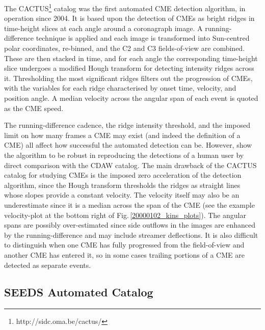 \documentclass[referee,a4paper,12pt,traditabstract]{swsc}
\begin{document}
\begin{linenumbers}
The CACTUS\footnote{http://sidc.oma.be/cactus/} catalog was the first automated CME detection algorithm, in operation since 2004. It is based upon the detection of CMEs as bright ridges in time-height slices at each angle around a coronagraph image. A running-difference technique is applied and each image is transformed into Sun-centred polar coordinates, re-binned, and the C2 and C3 fields-of-view are combined. These are then stacked in time, and for each angle the corresponding time-height slice undergoes a modified Hough transform for detecting intensity ridges across it. Thresholding the most significant ridges filters out the progression of CMEs, with the variables for each ridge characterised by onset time, velocity, and position angle. A median velocity across the angular span of each event is quoted as the CME speed.

The running-difference cadence, the ridge intensity threshold, and the imposed limit on how many frames a CME may exist (and indeed the definition of a CME) all affect how successful the automated detection can be. However, \citet{2004A&A...425.1097R} show the algorithm to be robust in reproducing the detections of a human user by direct comparison with the CDAW catalog. The main drawback of the CACTUS catalog for studying CMEs is the imposed zero acceleration of the detection algorithm, since the Hough transform thresholds the ridges as straight lines whose slopes provide a constant velocity. The velocity itself may also be an underestimate since it is a median across the span of the CME (see the example velocity-plot at the bottom right of Fig.\,\ref{20000102_kins_plots}). The angular spans are possibly over-estimated since side outflows in the images are enhanced by the running-difference and may include streamer deflections. It is also difficult to distinguish when one CME has fully progressed from the field-of-view and another CME has entered it, so in some cases trailing portions of a CME are detected as separate events.

\subsection{SEEDS Automated Catalog}


\end{linenumbers}
\end{document}
